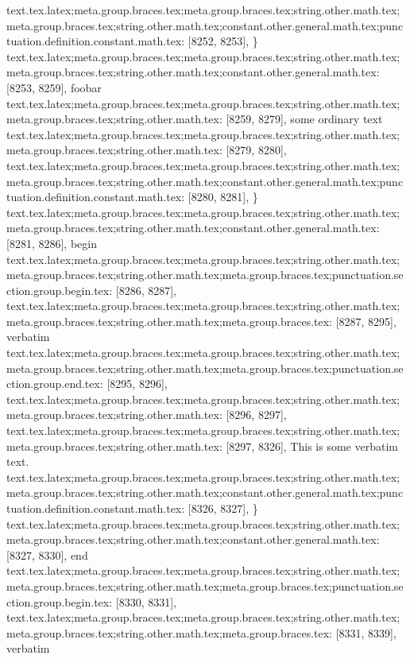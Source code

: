 {{{{{{{{{{{{{{{{{{{{{{{{{{{{{{{{{{{{{{{{{{{{{{{{{{{{{{{{{{{{{{{{{{{{{{{{{{{{{{{{{{{{{{{{{{{{{{{{{{{{{{{{{{{{{{{{{{{{{{{{{{{{{{{{{{{{{{{{{{{{{{{{{{{{{{{{{{{{{{{{{{{{{{{{{{{{{{{{{{{{{{{{{{{{{{{{{{{{{{{{{{{{{{{{{{{{{{{{{{{{{{{{{{{{{{{{{{{{{{{{{{}
text.tex.latex;meta.group.braces.tex;meta.group.braces.tex;string.other.math.tex;meta.group.braces.tex;string.other.math.tex;constant.other.general.math.tex;punctuation.definition.constant.math.tex: [8252, 8253], {\}
text.tex.latex;meta.group.braces.tex;meta.group.braces.tex;string.other.math.tex;meta.group.braces.tex;string.other.math.tex;constant.other.general.math.tex: [8253, 8259], {foobar}
text.tex.latex;meta.group.braces.tex;meta.group.braces.tex;string.other.math.tex;meta.group.braces.tex;string.other.math.tex: [8259, 8279], { some ordinary text
}
text.tex.latex;meta.group.braces.tex;meta.group.braces.tex;string.other.math.tex;meta.group.braces.tex;string.other.math.tex: [8279, 8280], {
}
text.tex.latex;meta.group.braces.tex;meta.group.braces.tex;string.other.math.tex;meta.group.braces.tex;string.other.math.tex;constant.other.general.math.tex;punctuation.definition.constant.math.tex: [8280, 8281], {\}
text.tex.latex;meta.group.braces.tex;meta.group.braces.tex;string.other.math.tex;meta.group.braces.tex;string.other.math.tex;constant.other.general.math.tex: [8281, 8286], {begin}
text.tex.latex;meta.group.braces.tex;meta.group.braces.tex;string.other.math.tex;meta.group.braces.tex;string.other.math.tex;meta.group.braces.tex;punctuation.section.group.begin.tex: [8286, 8287], {{}
text.tex.latex;meta.group.braces.tex;meta.group.braces.tex;string.other.math.tex;meta.group.braces.tex;string.other.math.tex;meta.group.braces.tex: [8287, 8295], {verbatim}
text.tex.latex;meta.group.braces.tex;meta.group.braces.tex;string.other.math.tex;meta.group.braces.tex;string.other.math.tex;meta.group.braces.tex;punctuation.section.group.end.tex: [8295, 8296], {}}
text.tex.latex;meta.group.braces.tex;meta.group.braces.tex;string.other.math.tex;meta.group.braces.tex;string.other.math.tex: [8296, 8297], {
}
text.tex.latex;meta.group.braces.tex;meta.group.braces.tex;string.other.math.tex;meta.group.braces.tex;string.other.math.tex: [8297, 8326], {	This is some verbatim text.
}
text.tex.latex;meta.group.braces.tex;meta.group.braces.tex;string.other.math.tex;meta.group.braces.tex;string.other.math.tex;constant.other.general.math.tex;punctuation.definition.constant.math.tex: [8326, 8327], {\}
text.tex.latex;meta.group.braces.tex;meta.group.braces.tex;string.other.math.tex;meta.group.braces.tex;string.other.math.tex;constant.other.general.math.tex: [8327, 8330], {end}
text.tex.latex;meta.group.braces.tex;meta.group.braces.tex;string.other.math.tex;meta.group.braces.tex;string.other.math.tex;meta.group.braces.tex;punctuation.section.group.begin.tex: [8330, 8331], {{}
text.tex.latex;meta.group.braces.tex;meta.group.braces.tex;string.other.math.tex;meta.group.braces.tex;string.other.math.tex;meta.group.braces.tex: [8331, 8339], {verbatim}
}}}}}}}}}}}}}}}}}}}}}}}}}}}}}}}}}}}}}}}}}}}}}}}}}}}}}}}}}}}}}}}}}}}}}}}}}}}}}}}}}}}}}}}}}}}}}}}}}}}}}}}}}}}}}}}}}}}}}}}}}}}}}}}}}}}}}}}}}}}}}}}}}}}}}}}}}}}}}}}}}}}}}}}}}}}}}}}}}}}}}}}}}}}}}}}}}}}}}}}}}}}}}}}}}}}}}}}}}}}}}}}}}}}}}}}}}}}}}}}}}}}}}
